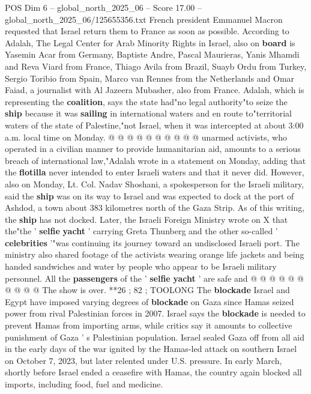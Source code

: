 \begin{textsample}{POS Dim 6 – global\_north\_2025\_06 – Score 17.00 – global\_north\_2025\_06/125655356.txt}
French president Emmanuel Macron requested that Israel return them to France as soon as possible.
According to Adalah, The Legal Center for Arab Minority Rights in Israel, also on \textbf{board} is Yasemin Acar from Germany, Baptiste Andre, Pascal Maurieras, Yanis Mhamdi and Reva Viard from France, Thiago Avila from Brazil, Suayb Ordu from Turkey, Sergio Toribio from Spain, Marco van Rennes from the Netherlands and Omar Faiad, a journalist with Al Jazeera Mubasher, also from France.
Adalah, which is representing the \textbf{coalition}, says the state had"no legal authority"to seize the \textbf{ship} because it was \textbf{sailing} in international waters and en route to"territorial waters of the state of Palestine,"not Israel, when it was intercepted at about 3:00 a.m. local time on Monday. @ @ @ @ @ @ @ @ @ @ unarmed activists, who operated in a civilian manner to provide humanitarian aid, amounts to a serious breach of international law,"Adalah wrote in a statement on Monday, adding that the \textbf{flotilla} never intended to enter Israeli waters and that it never did.
However, also on Monday, Lt.
Col.
Nadav Shoshani, a spokesperson for the Israeli military, said the \textbf{ship} was on its way to Israel and was expected to dock at the port of Ashdod, a town about 383 kilometres north of the Gaza Strip.
As of this writing, the \textbf{ship} has not docked.
Later, the Israeli Foreign Ministry wrote on X that the"the ' \textbf{selfie} \textbf{yacht} ' carrying Greta Thunberg and the other so-called ' \textbf{celebrities} '"was continuing its journey toward an undisclosed Israeli port.
The ministry also shared footage of the activists wearing orange life jackets and being handed sandwiches and water by people who appear to be Israeli military personnel.
All the \textbf{passengers} of the ' \textbf{selfie} \textbf{yacht} ' are safe and @ @ @ @ @ @ @ @ @ @ The show is over. **26 ; 82 ; TOOLONG The \textbf{blockade} Israel and Egypt have imposed varying degrees of \textbf{blockade} on Gaza since Hamas seized power from rival Palestinian forces in 2007.
Israel says the \textbf{blockade} is needed to prevent Hamas from importing arms, while critics say it amounts to collective punishment of Gaza ' s Palestinian population.
Israel sealed Gaza off from all aid in the early days of the war ignited by the Hamas-led attack on southern Israel on October 7, 2023, but later relented under U.S. pressure.
In early March, shortly before Israel ended a ceasefire with Hamas, the country again blocked all imports, including food, fuel and medicine.

\end{textsample}
